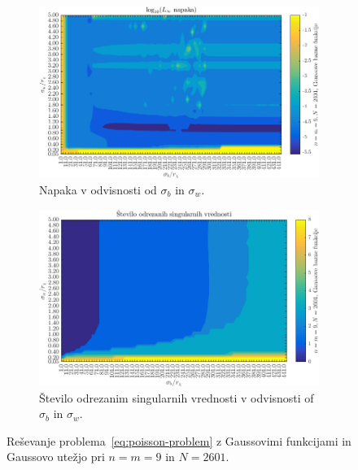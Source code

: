 \documentclass[a4paper,twoside]{article}
\theoremstyle{definition} %
\theoremstyle{plain} %
\numberwithin{equation}{section}
\begin{document}
\begin{figure}[h]
  \centering
  \begin{subfigure}[t]{0.45\textwidth}
    \includegraphics[width=\textwidth]{images/poisson_square_sigma_depedence_error.png}
    \caption{Napaka v odvisnosti od $\sigma_b$ in $\sigma_w$.}
    \label{fig:poisson-square-sigma-dep-error}
  \end{subfigure}
  \begin{subfigure}[t]{0.45\textwidth}
    \includegraphics[width=\textwidth]{images/poisson_square_sigma_depedence_cutoff.png}
    \caption{Število odrezanim singularnih vrednosti v odvisnosti of $\sigma_b$
    in $\sigma_w$.}
    \label{fig:poisson-square-sigma-dep-cutoff}
  \end{subfigure}
  \caption{Reševanje problema~\eqref{eq:poisson-problem} z Gaussovimi funkcijami
  in Gaussovo utežjo pri $n = m = 9$ in $N = 2601$.}
  \label{fig:poisson-square-sigma-dep}
\end{figure}
\end{document}
